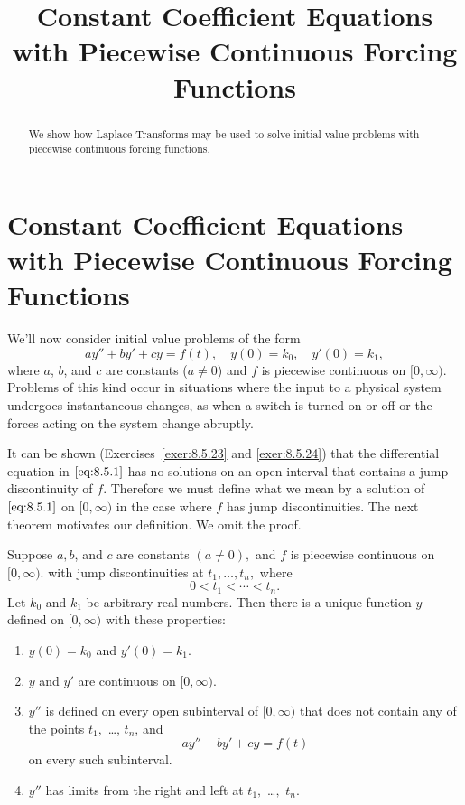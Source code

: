 \documentclass{ximera}
\title{Constant Coefficient Equations with Piecewise Continuous Forcing Functions}%
\begin{document}
\begin{abstract}
We show how Laplace Transforms may be used to solve initial value problems with piecewise continuous forcing functions.
\end{abstract}

\maketitle

\section*{Constant Coefficient Equations with Piecewise Continuous Forcing Functions}

We'll now consider initial value problems of the form
\begin{equation}\label{eq:8.5.1}
 ay''+by'+cy=f(t), \quad  y(0)=k_0,\quad y'(0)=k_1,
\end{equation}
where $a$, $b$, and $c$ are constants ($a\neq 0$) and $f$ is piecewise
continuous on $[0,\infty)$. Problems of this kind occur in situations
where the input to a physical system undergoes instantaneous changes,
as when a switch is turned on or off or the forces acting on the
system change abruptly.

It can be shown (Exercises~\ref{exer:8.5.23} and \ref{exer:8.5.24}) 
that the differential equation in $\eqref{eq:8.5.1}$ has no solutions on
an open interval that contains a jump discontinuity of $f$. Therefore we
must define what we mean by a solution of $\eqref{eq:8.5.1}$ on $[0,\infty)$
in the case where $f$ has jump discontinuities. The next theorem
motivates our definition. We omit the proof.

\begin{theorem}\label{thmtype:8.5.1}
Suppose $a,b$, and $c$ are constants $(a\neq 0),$ and $f$ is
piecewise  continuous on $[0,\infty).$ with jump discontinuities
at $t_1, \dots, t_n,$ where
$$
0<t_1<\cdots<t_n.
$$
 Let $k_0$ and $k_1$ be arbitrary real numbers. Then there
is a unique function $y$ defined on $[0,\infty)$ with these
properties:
\begin{enumerate}
\item %
 $y(0)=k_0$ and  $y'(0)=k_1$.
\item %
 $y$ and $y'$  are continuous on $[0,\infty)$.
\item %
$y''$ is defined
on every open subinterval of $[0,\infty)$ that does not contain any of the
points $t_1,$ \dots, $t_n$, and
$$
ay''+by'+cy=f(t)
$$
on every such subinterval.
\item %
$y''$ has limits from the right and left at $t_1,$ \dots$,$ $t_n$.
\end{enumerate}
\end{theorem}
\end{document}
